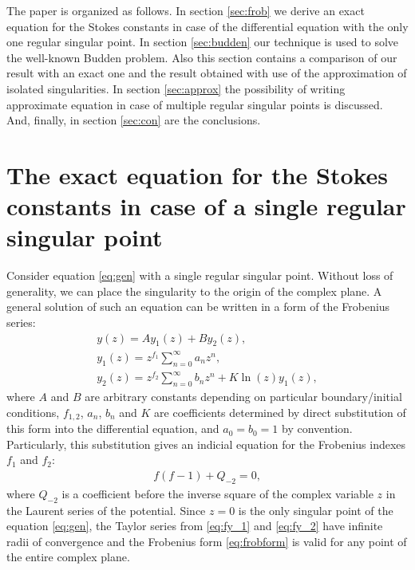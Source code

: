 \documentclass[aip,jmp,reprint]{revtex4-1}
\begin{document}
The paper is organized as follows.
In section \ref{sec:frob} we derive an exact equation for the Stokes constants in case of the differential
equation with the only one regular singular point. 
In section \ref{sec:budden} our technique is used to solve the well-known Budden problem. Also this
section contains a comparison of our result with an exact one and the result obtained with use
of the approximation of isolated singularities.
In section \ref{sec:approx} the possibility of writing approximate equation in case of multiple 
regular singular points is discussed.
And, finally, in section \ref{sec:con} are the conclusions. 

\section{The exact equation for the Stokes constants in case of a single regular singular point \label{sec:frob}}
Consider equation \eqref{eq:gen} with a single regular singular point. Without loss of generality,
we can place the singularity to the origin of the complex plane. A general solution of such an equation 
can be written in a form of the Frobenius series\cite{cbbook}:
\begin{subequations}
\label{eq:frobform}
\begin{eqnarray}
y(z) = A y_1(z)+B y_2(z), \label{eq:fgensol}
\\
y_1(z) = z^{f_1}\sum_{n=0}^{\infty}{a_n z^n}, \label{eq:fy_1}
\\
y_2(z) = z^{f_2}\sum_{n=0}^{\infty}{b_n z^n} + K \ln(z) y_1(z), \label{eq:fy_2}
\end{eqnarray}
\end{subequations}
where $A$ and $B$ are arbitrary constants depending on particular boundary/initial conditions,  
$f_{1,2}$, $a_n$, $b_n$ and $K$ are coefficients determined by direct substitution of this form into the 
differential equation, and $a_0=b_0=1$ by convention. Particularly, this substitution gives
an indicial equation for the Frobenius indexes $f_1$ and $f_2$:
\begin{eqnarray}
f(f-1)+Q_{-2}=0,   \label{eq:indicial}
\end{eqnarray}
where $Q_{-2}$ is a coefficient before the inverse square of the complex variable $z$ in the Laurent series
of the potential. Since $z=0$ is the only singular point of the equation \eqref{eq:gen}, the Taylor 
series from \eqref{eq:fy_1} and \eqref{eq:fy_2} have infinite radii of convergence and the
Frobenius form \eqref{eq:frobform} is valid for any point of the entire complex plane.
\end{document}
